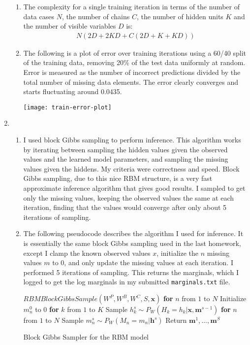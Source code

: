 \documentclass[12pt]{article}
\newcommand{\mbf}[1]{{\mathbf{#1}}}
\begin{document}
\begin{enumerate}
\begin{enumerate}
\item
The complexity for a single training iteration in terms of the number of data cases $N$, the number of chains $C$, the number of hidden units $K$ and the number of visible variables $D$ is:
\begin{align*}
N(2D+2KD+C(2D+K+KD))
\end{align*}

\item
The following is a plot of error over training iterations using a 60/40 split of the training data, removing 20\% of the test data uniformly at random. Error is measured as the number of incorrect predictions divided by the total number of missing data elements. The error clearly converges and starts fluctuating around 0.0435.
\begin{center}
\texttt{[image: train-error-plot]}
\end{center}

\end{enumerate}

\item %
\begin{enumerate}
\item
I used block Gibbs sampling to perform inference. This algorithm works by iterating between sampling the hidden values given the observed values and the learned model parameters, and sampling the missing values given the hiddens. My criteria were correctness and speed. Block Gibbs sampling, due to this nice RBM structure, is a very fast approximate inference algorithm that gives good results. I sampled to get only the missing values, keeping the observed values the same at each iteration, finding that the values would converge after only about 5 iterations of sampling.

\item
The following pseudocode describes the algorithm I used for inference. It is essentially the same block Gibbs sampling used in the last homework, except I clamp the known observed values $x$, initialize the $n$ missing values $m$ to 0, and only update the missing values at each iteration. I performed 5 iterations of sampling. This returns the marginals, which I logged to get the log marginals in my submitted \texttt{marginals.txt} file.

\begin{algorithm}[h!]
\begin{algorithmic}
\STATE $RBMBlockGibbsSample(W^P,W^B,W^C,S,\mbf{x})$
\STATE \textbf{for} $n$ from $1$ to $N$ Initialize $m_n^0$ to 0
\STATE \textbf{for} $k$ from $1$ to $K$ Sample $h_k^{s}\sim P_W(H_k=h_k|\mbf{x},\mbf{m}^{s-1})$
\STATE \textbf{for} $n$ from $1$ to $N$ Sample $m_n^{s}\sim P_W(M_n=m_n|\mbf{h}^{s})$
\ENDFOR
\STATE Return $\mbf{m}^1,...,\mbf{m}^S$
\end{algorithmic}
\caption{Block Gibbs Sampler for the RBM model}
\label{inference}
\end{algorithm}


\end{enumerate}
\end{enumerate}
\end{document}
